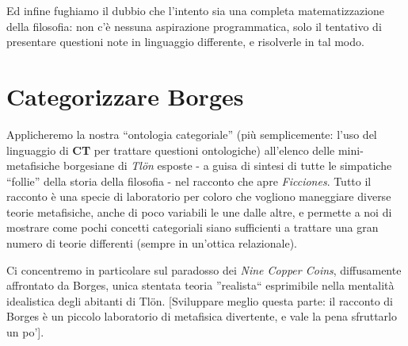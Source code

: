 \documentclass[a4paper, 11pt]{article}
\begin{document}
Ed infine fughiamo il dubbio che l'intento sia una completa matematizzazione della filosofia: non c'è nessuna aspirazione programmatica, solo il tentativo di presentare questioni note in linguaggio differente, e risolverle in tal modo.
\section{Categorizzare Borges}
Applicheremo la nostra ``ontologia categoriale'' (più semplicemente: l'uso del linguaggio di \textbf{CT} per trattare questioni ontologiche) all'elenco delle mini-metafisiche borgesiane di \textit{Tl\"on} esposte - a guisa di sintesi di tutte le simpatiche ``follie'' della storia della filosofia - nel racconto che apre \textit{Ficciones}. Tutto il racconto è una specie di laboratorio per coloro che vogliono maneggiare diverse teorie metafisiche, anche di poco variabili le une dalle altre, e permette a noi di mostrare come pochi concetti categoriali siano sufficienti a trattare una gran numero di teorie differenti (sempre in un'ottica relazionale).

Ci concentremo in particolare sul paradosso dei \textit{Nine Copper Coins}, diffusamente affrontato da Borges, unica stentata teoria ''realista`` esprimibile nella mentalità idealistica degli abitanti di Tl\"on.
[Sviluppare meglio questa parte: il racconto di Borges è un piccolo laboratorio di metafisica divertente, e vale la pena sfruttarlo un po'].


\endfo
\end{document}
